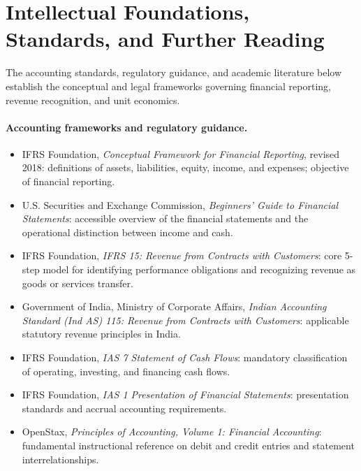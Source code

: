 \section*{Intellectual Foundations, Standards, and Further Reading}

The accounting standards, regulatory guidance, and academic literature below establish the conceptual and legal frameworks governing financial reporting, revenue recognition, and unit economics.

\paragraph{Accounting frameworks and regulatory guidance.}
\begin{itemize}
  \item IFRS Foundation, \emph{Conceptual Framework for Financial Reporting}, revised 2018: definitions of assets, liabilities, equity, income, and expenses; objective of financial reporting.
  \item U.S. Securities and Exchange Commission, \emph{Beginners' Guide to Financial Statements}: accessible overview of the financial statements and the operational distinction between income and cash.
  \item IFRS Foundation, \emph{IFRS 15: Revenue from Contracts with Customers}: core 5-step model for identifying performance obligations and recognizing revenue as goods or services transfer.
  \item Government of India, Ministry of Corporate Affairs, \emph{Indian Accounting Standard (Ind AS) 115: Revenue from Contracts with Customers}: applicable statutory revenue principles in India.
  \item IFRS Foundation, \emph{IAS 7 Statement of Cash Flows}: mandatory classification of operating, investing, and financing cash flows.
  \item IFRS Foundation, \emph{IAS 1 Presentation of Financial Statements}: presentation standards and accrual accounting requirements.
  \item OpenStax, \emph{Principles of Accounting, Volume 1: Financial Accounting}: fundamental instructional reference on debit and credit entries and statement interrelationships.
\end{itemize}

